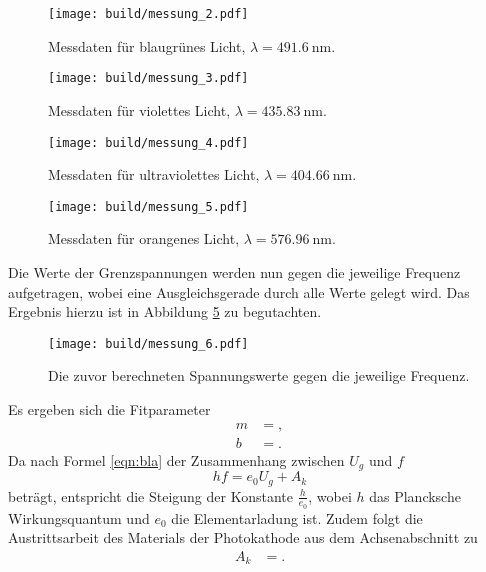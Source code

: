 \begin{figure}
  \centering
  \texttt{[image: build/messung\_2.pdf]}
  \caption{Messdaten für blaugrünes Licht, $\lambda = \SI{491,6}{\nano\metre}$.}
  \label{plot:2}
\end{figure}

\begin{figure}
  \centering
  \texttt{[image: build/messung\_3.pdf]}
  \caption{Messdaten für violettes Licht, $\lambda = \SI{435,83}{\nano\metre}$.}
  \label{plot:3}
\end{figure}

\begin{figure}
  \centering
  \texttt{[image: build/messung\_4.pdf]}
  \caption{Messdaten für ultraviolettes Licht, $\lambda = \SI{404,66}{\nano\metre}$.}
  \label{plot:4}
\end{figure}

\begin{figure}
  \centering
  \texttt{[image: build/messung\_5.pdf]}
  \caption{Messdaten für orangenes Licht, $\lambda = \SI{576,96}{\nano\metre}$.}
  \label{plot:5}
\end{figure}

Die Werte der Grenzspannungen werden nun gegen die jeweilige Frequenz aufgetragen, wobei eine Ausgleichsgerade durch alle Werte gelegt wird.
Das Ergebnis hierzu ist in Abbildung \ref{plot:6} zu begutachten.

\begin{figure}
  \centering
  \texttt{[image: build/messung\_6.pdf]}
  \caption{Die zuvor berechneten Spannungswerte gegen die jeweilige Frequenz.}
  \label{plot:6}
\end{figure}

Es ergeben sich die Fitparameter
\begin{align*}
  m &= ,\\
  b &= .
\end{align*}
Da nach Formel \eqref{eqn:bla} der Zusammenhang zwischen $U_g$ und $f$
\begin{equation}
  h f = e_0 U_g + A_k
\end{equation}
beträgt, entspricht die Steigung der Konstante $\frac{h}{e_0}$, wobei $h$ das Plancksche Wirkungsquantum und $e_0$ die Elementarladung ist.
Zudem folgt die Austrittsarbeit des Materials der Photokathode aus dem Achsenabschnitt zu
\begin{align*}
  A_k &= .
\end{align*}

